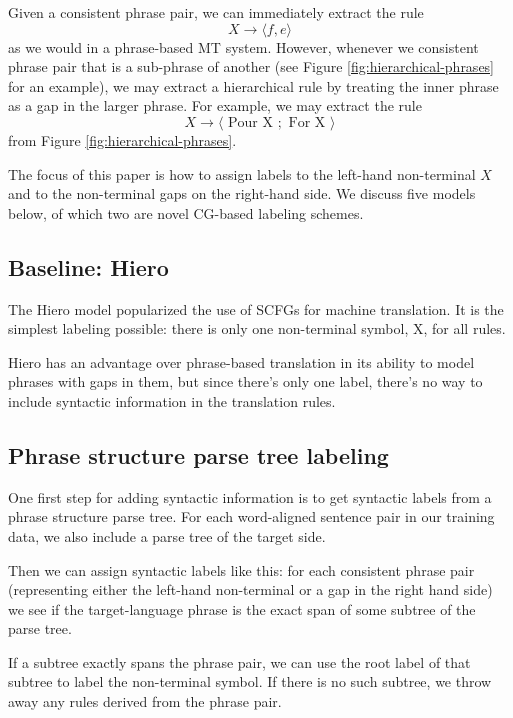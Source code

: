\documentclass[a4paper]{article}
\begin{document}
Given a consistent phrase pair, we can immediately extract the rule
\begin{equation}
X \to \langle f , e \rangle
\end{equation}
as we would in a phrase-based MT system. However, whenever we consistent phrase pair that is a sub-phrase of another (see Figure \ref{fig:hierarchical-phrases} for an example), we may extract a hierarchical rule by treating the inner phrase as a gap in the larger phrase. For example, we may extract the rule
\begin{equation}
X \to \langle \textrm{ Pour X }; \textrm{ For X } \rangle
\label{eqn:hiero-rule}
\end{equation}
from Figure \ref{fig:hierarchical-phrases}.

The focus of this paper is how to assign labels to the left-hand non-terminal $X$ and to the non-terminal gaps on the right-hand side. We discuss five models below, of which two are novel CG-based labeling schemes.

\subsection{Baseline: Hiero}

The Hiero model \cite{chiang2005} popularized the use of SCFGs for machine translation. It is the simplest labeling possible: there is only one non-terminal symbol, X, for all rules.

Hiero has an advantage over phrase-based translation in its ability to model phrases with gaps in them, but since there's only one label, there's no way to include syntactic information in the translation rules.

\subsection{Phrase structure parse tree labeling}

One first step for adding syntactic information is to get syntactic labels from a phrase structure parse tree. For each word-aligned sentence pair in our training data, we also include a parse tree of the target side.

Then we can assign syntactic labels like this: for each consistent phrase pair (representing either the left-hand non-terminal or a gap in the right hand side) we see if the target-language phrase is the exact span of some subtree of the parse tree.

If a subtree exactly spans the phrase pair, we can use the root label of that subtree to label the non-terminal symbol. If there is no such subtree, we throw away any rules derived from the phrase pair.
\end{document}
